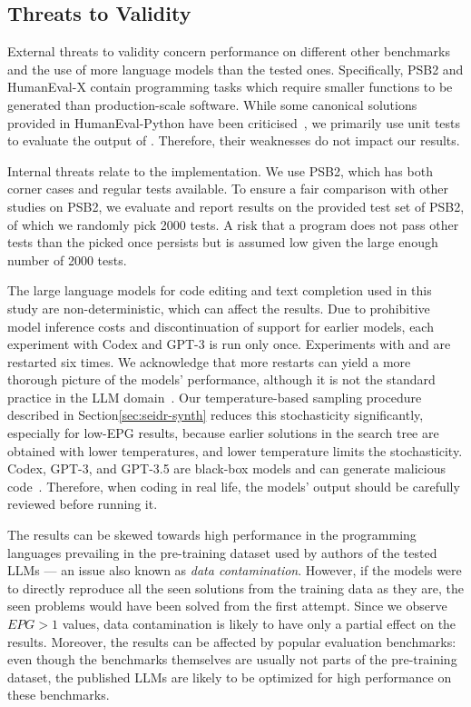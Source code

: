 \subsection{Threats to Validity}
\label{sec:seidr-threats}

External threats to validity concern \method{} performance on different other benchmarks and the use of more language models than the tested ones. 
Specifically, PSB2 and HumanEval-X contain programming tasks which require smaller functions to be generated than production-scale software.
While some canonical solutions provided in HumanEval-Python have been criticised~\cite{liu2023:your}, we primarily use unit tests to evaluate the output of \method{}. Therefore, their weaknesses do not impact our results.

Internal threats relate to the implementation.
We use PSB2, which has both corner cases and regular tests available. 
To ensure a fair comparison with other studies on PSB2, we evaluate and report results on the provided test set of PSB2, of which we randomly pick 2000 tests. 
A risk that a program does not pass other tests than the picked once persists but is assumed low given the large enough number of 2000 tests. 

The large language models for code editing and text completion used in this study are non-deterministic, 
which can affect the results. 
Due to prohibitive model inference costs and discontinuation of support for earlier models, each experiment with Codex and GPT-3 is run only once. 
Experiments with \llama{} and \gpt{} are restarted six times. 
We acknowledge that more restarts can yield a more thorough picture of the models' performance, although it is not the standard practice in the LLM domain~\cite{ouyang2023:llm}.
Our temperature-based sampling procedure described in Section\ref{sec:seidr-synth} reduces this stochasticity significantly, especially for low-EPG results, because earlier solutions in the search tree are obtained with lower temperatures, and lower temperature limits the stochasticity.
Codex, GPT-3, and GPT-3.5 are black-box models and can generate malicious code~\cite{pearce2022:asleep}. 
Therefore, when coding in real life, the models' output should be carefully reviewed before running it.

The results can be skewed towards high performance in the programming languages prevailing in the pre-training dataset used by authors of the tested LLMs --- an issue also known as \emph{data contamination}.
However, if the models were to directly reproduce all the seen solutions from the training data as they are, the seen problems would have been solved from the first attempt.
Since we observe $EPG>1$ values, data contamination is likely to have only a partial effect on the results.
Moreover, the results can be affected by popular evaluation benchmarks: even though the benchmarks themselves are usually not parts of the pre-training dataset, the published LLMs are likely to be optimized for high performance on these benchmarks.   

